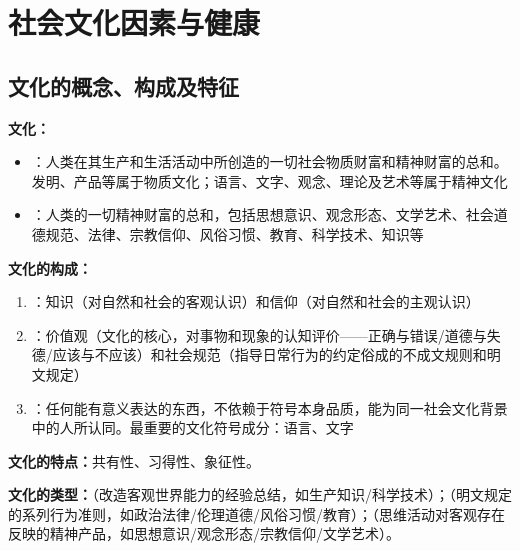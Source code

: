 \chapter{社会文化因素与健康}
\setcounter{chapter}{6}

\section{文化的概念、构成及特征}

\begin{defbox}
\textbf{文化：}
\begin{itemize}[leftmargin=*]
    \item {}：人类在其生产和生活活动中所创造的一切社会物质财富和精神财富的总和。发明、产品等属于物质文化；语言、文字、观念、理论及艺术等属于精神文化
    \item {}：人类的一切精神财富的总和，包括思想意识、观念形态、文学艺术、社会道德规范、法律、宗教信仰、风俗习惯、教育、科学技术、知识等
\end{itemize}

\textbf{文化的构成：}
\begin{enumerate}[leftmargin=*]
    \item {}：知识（对自然和社会的客观认识）和信仰（对自然和社会的主观认识）
    \item {}：价值观（文化的核心，对事物和现象的认知评价——正确与错误/道德与失德/应该与不应该）和社会规范（指导日常行为的约定俗成的不成文规则和明文规定）
    \item {}：任何能有意义表达的东西，不依赖于符号本身品质，能为同一社会文化背景中的人所认同。最重要的文化符号成分：语言、文字
\end{enumerate}

\textbf{文化的特点：}共有性、习得性、象征性。

\textbf{文化的类型：}（改造客观世界能力的经验总结，如生产知识/科学技术）；（明文规定的系列行为准则，如政治法律/伦理道德/风俗习惯/教育）；（思维活动对客观存在反映的精神产品，如思想意识/观念形态/宗教信仰/文学艺术）。
\end{defbox}

